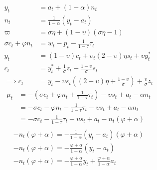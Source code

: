 \begin{align}
    y_t &= a_t + (1-\alpha)n_t\\
    n_t &= \frac{1}{1-\alpha}(y_t - a_t)\\
    \varpi &= \sigma \eta + (1-\upsilon)(\sigma \eta - 1)\\
    \sigma c_t + \varphi n_t &= w_t - p_t - \frac{1}{1-\tau}\tau_t\\
    y_t &= (1-\upsilon)c_t + \upsilon_t(2-\upsilon)\eta s_t + \upsilon y_t^*\\
    c_t &= y_t^* + \frac{1}{\sigma}z_t + \frac{1-\upsilon}{\sigma}s_t\\
    \implies c_t &= y_t - \upsilon s_t \left( (2-\upsilon)\eta + \frac{1-\upsilon}{\sigma}\right) + \frac{\upsilon}{\sigma}z_t
\end{align}
\begin{align}
    \mu_t &= -(\sigma c_t + \varphi n_t + \frac{1}{1-\tau}\tau_t) - \upsilon s_t + a_t - \alpha n_t\\
    &= -\sigma c_t - \varphi n_t - \frac{1}{1-\tau}\tau_t - \upsilon s_t + a_t - \alpha n_t\\
    &= -\sigma c_t - \frac{1}{1-\tau}\tau_t - \upsilon s_t + a_t - n_t(\varphi + \alpha)\\
\end{align}
\begin{align}
    -n_t(\varphi + \alpha) = -\frac{1}{1-\alpha}(y_t - a_t)(\varphi + \alpha)\\
    -n_t(\varphi + \alpha) = -\frac{\varphi + \alpha}{1-\alpha}(y_t - a_t)\\
    -n_t(\varphi + \alpha) = -\frac{\varphi + \alpha}{1-\alpha}y_t + \frac{\varphi + \alpha}{1-\alpha}a_t\\
\end{align}
